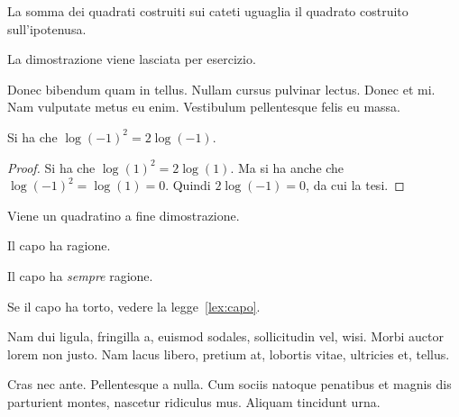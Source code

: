 \lipsum[2]

\begin{teorema}[di Pitagora]
La somma dei quadrati costruiti sui cateti uguaglia il quadrato costruito sull'ipotenusa.
\end{teorema}
La dimostrazione viene lasciata per esercizio.

Donec bibendum quam in tellus. Nullam cursus pulvinar lectus. Donec et mi. Nam vulputate metus eu enim. Vestibulum pellentesque felis eu massa.
\begin{teorema}[Sorpresa]
Si ha che $\log(-1)^2=2\log(-1)$.
\end{teorema} 
\begin{proof} 
Si ha che $\log(1)^2 = 2\log(1)$.
Ma si ha anche che $\log(-1)^2=\log(1)=0$.
Quindi $2\log(-1)=0$, da cui la tesi.
\end{proof}
Viene un quadratino a fine dimostrazione.
\begin{legge}
\label{lex:capo}
Il capo ha ragione.
\end{legge}
\begin{decreto}
Il capo ha \emph{sempre} ragione.
\end{decreto}
\begin{legge}
Se il capo ha torto, vedere la 
legge~\ref{lex:capo}.
\end{legge}


Nam dui ligula, fringilla a, euismod sodales, sollicitudin vel, wisi. Morbi auctor lorem non justo. Nam lacus libero, pretium at, lobortis vitae, ultricies et, tellus.

Cras nec ante. Pellentesque a nulla. Cum sociis natoque penatibus et magnis dis parturient montes, nascetur ridiculus mus. Aliquam tincidunt urna.
